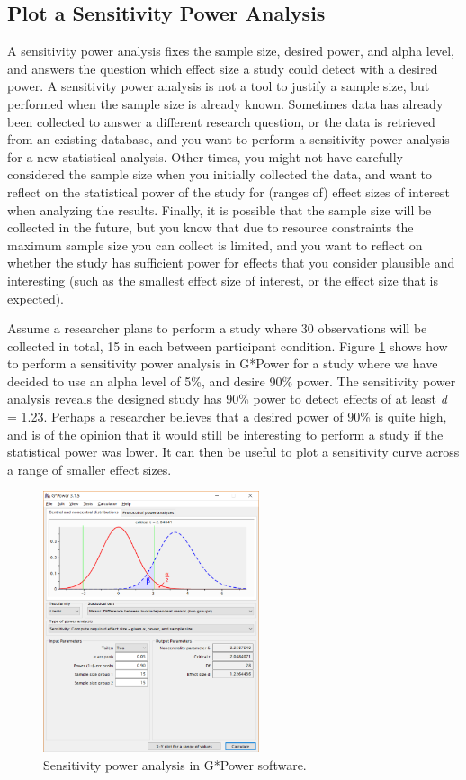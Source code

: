 \documentclass[
  english,
  ,jou, a4paper,floatsintext]{apa6}
\begin{document}
\hypertarget{plot-a-sensitivity-power-analysis}{%
\subsection{Plot a Sensitivity Power Analysis}\label{plot-a-sensitivity-power-analysis}}

A sensitivity power analysis fixes the sample size, desired power, and alpha level, and answers the question which effect size a study could detect with a desired power. A sensitivity power analysis is not a tool to justify a sample size, but performed when the sample size is already known. Sometimes data has already been collected to answer a different research question, or the data is retrieved from an existing database, and you want to perform a sensitivity power analysis for a new statistical analysis. Other times, you might not have carefully considered the sample size when you initially collected the data, and want to reflect on the statistical power of the study for (ranges of) effect sizes of interest when analyzing the results. Finally, it is possible that the sample size will be collected in the future, but you know that due to resource constraints the maximum sample size you can collect is limited, and you want to reflect on whether the study has sufficient power for effects that you consider plausible and interesting (such as the smallest effect size of interest, or the effect size that is expected).

Assume a researcher plans to perform a study where 30 observations will be collected in total, 15 in each between participant condition. Figure \ref{fig:gsens0} shows how to perform a sensitivity power analysis in G*Power for a study where we have decided to use an alpha level of 5\%, and desire 90\% power. The sensitivity power analysis reveals the designed study has 90\% power to detect effects of at least \emph{d} = 1.23. Perhaps a researcher believes that a desired power of 90\% is quite high, and is of the opinion that it would still be interesting to perform a study if the statistical power was lower. It can then be useful to plot a sensitivity curve across a range of smaller effect sizes.

\begin{figure}
\includegraphics[width=240px]{images/gpow_sensitivity_1} \caption{Sensitivity power analysis in G*Power software.}\label{fig:gsens0}
\end{figure}
\end{document}
